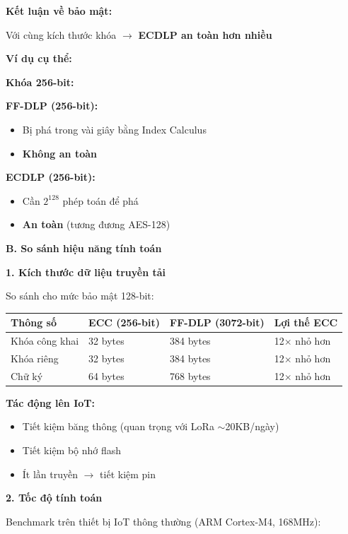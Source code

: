 \textbf{Kết luận về bảo mật:}

Với cùng kích thước khóa $\rightarrow$ \textbf{ECDLP an toàn hơn nhiều}

\textbf{Ví dụ cụ thể:}

\textbf{Khóa 256-bit:}

\textbf{FF-DLP (256-bit):}
\begin{itemize}
    \item Bị phá trong vài giây bằng Index Calculus
    \item \textbf{Không an toàn}
\end{itemize}

\textbf{ECDLP (256-bit):}
\begin{itemize}
    \item Cần $2^{128}$ phép toán để phá
    \item \textbf{An toàn} (tương đương AES-128)
\end{itemize}

\textbf{B. So sánh hiệu năng tính toán}

\textbf{1. Kích thước dữ liệu truyền tải}

So sánh cho mức bảo mật 128-bit:

\begin{center}
\begin{tabular}{|p{3.5cm}|p{3cm}|p{3cm}|p{3cm}|}
\hline
\textbf{Thông số} & \textbf{ECC (256-bit)} & \textbf{FF-DLP (3072-bit)} & \textbf{Lợi thế ECC} \\
\hline
Khóa công khai & 32 bytes & 384 bytes & 12$\times$ nhỏ hơn \\
Khóa riêng & 32 bytes & 384 bytes & 12$\times$ nhỏ hơn \\
Chữ ký & 64 bytes & 768 bytes & 12$\times$ nhỏ hơn \\
\hline
\end{tabular}
\end{center}

\textbf{Tác động lên IoT:}
\begin{itemize}
    \item Tiết kiệm băng thông (quan trọng với LoRa $\sim$20KB/ngày)
    \item Tiết kiệm bộ nhớ flash
    \item Ít lần truyền $\rightarrow$ tiết kiệm pin
\end{itemize}

\textbf{2. Tốc độ tính toán}

Benchmark trên thiết bị IoT thông thường (ARM Cortex-M4, 168MHz):


